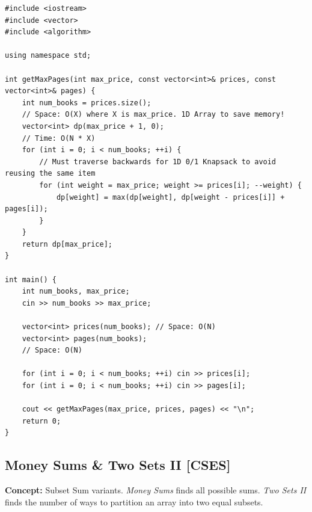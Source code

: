 \begin{lstlisting}
#include <iostream>
#include <vector>
#include <algorithm>

using namespace std;

int getMaxPages(int max_price, const vector<int>& prices, const vector<int>& pages) {
    int num_books = prices.size();
    // Space: O(X) where X is max_price. 1D Array to save memory!
    vector<int> dp(max_price + 1, 0);
    // Time: O(N * X)
    for (int i = 0; i < num_books; ++i) {
        // Must traverse backwards for 1D 0/1 Knapsack to avoid reusing the same item
        for (int weight = max_price; weight >= prices[i]; --weight) {
            dp[weight] = max(dp[weight], dp[weight - prices[i]] + pages[i]);
        }
    }
    return dp[max_price];
}

int main() {
    int num_books, max_price;
    cin >> num_books >> max_price;
    
    vector<int> prices(num_books); // Space: O(N)
    vector<int> pages(num_books);
    // Space: O(N)
    
    for (int i = 0; i < num_books; ++i) cin >> prices[i];
    for (int i = 0; i < num_books; ++i) cin >> pages[i];
    
    cout << getMaxPages(max_price, prices, pages) << "\n";
    return 0;
}
\end{lstlisting}

\subsection{Money Sums \& Two Sets II [CSES]}
\textbf{Concept:} Subset Sum variants. \textit{Money Sums} finds all possible sums.
\textit{Two Sets II} finds the number of ways to partition an array into two equal subsets.

